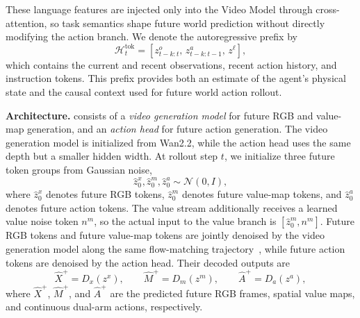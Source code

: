 These language features are injected only into the Video Model through cross-attention, so task semantics shape future world prediction without directly modifying the action branch. We denote the autoregressive prefix by
\begin{equation}
\mathcal{H}^{\mathrm{tok}}_t =
\left[z_{t-k:t}^{o},\, z_{t-k:t-1}^{a},\, z^{\ell}\right],
\end{equation}
which contains the current and recent observations, recent action history, and instruction tokens. This prefix provides both an estimate of the agent's physical state and the causal context used for future world action rollout.

\noindent\textbf{Architecture.} \method consists of a \emph{video generation model} for future RGB and value-map generation, and an \emph{action head} for future action generation. The video generation model is initialized from Wan2.2, while the action head uses the same depth but a smaller hidden width. At rollout step $t$, we initialize three future token groups from Gaussian noise,
\begin{equation}
\hat{z}_{0}^{x}, \hat{z}_{0}^{m}, \hat{z}_{0}^{a} \sim \mathcal{N}(0, I),
\end{equation}
where $\hat{z}_{0}^{x}$ denotes future RGB tokens, $\hat{z}_{0}^{m}$ denotes future value-map tokens, and $\hat{z}_{0}^{a}$ denotes future action tokens. The value stream additionally receives a learned value noise token $n^{m}$, so the actual input to the value branch is $[\hat{z}_{0}^{m}, n^m]$. Future RGB tokens and future value-map tokens are jointly denoised by the video generation model along the same flow-matching trajectory~\cite{lipman2023flowmatching}, while future action tokens are denoised by the action head. Their decoded outputs are
\begin{equation}
\hat{X}^{+} = D_x(z^{x}), \qquad
\hat{M}^{+} = D_m(z^{m}), \qquad
\hat{A}^{+} = D_a(z^{a}),
\end{equation}
where $\hat{X}^{+}$, $\hat{M}^{+}$, and $\hat{A}^{+}$ are the predicted future RGB frames, spatial value maps, and continuous dual-arm actions, respectively.

